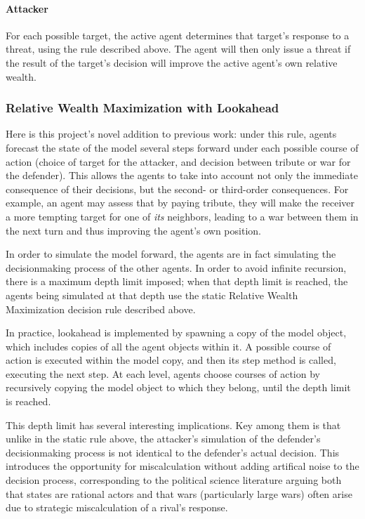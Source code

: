 \documentclass{article}
\begin{document}
\paragraph{Attacker}
For each possible target, the active agent determines that target's response to a threat, using the rule described above. The agent will then only issue a threat if the result of the target's decision will improve the active agent's own relative wealth.

\subsubsection{Relative Wealth Maximization with Lookahead}

Here is this project's novel addition to previous work: under this rule, agents forecast the state of the model several steps forward under each possible course of action (choice of target for the attacker, and decision between tribute or war for the defender). This allows the agents to take into account not only the immediate consequence of their decisions, but the second- or third-order consequences. For example, an agent may assess that by paying tribute, they will make the receiver a more tempting target for one of \emph{its} neighbors, leading to a war between them in the next turn and thus improving the agent's own position.

In order to simulate the model forward, the agents are in fact simulating the decisionmaking process of the other agents. In order to avoid infinite recursion, there is a maximum depth limit imposed; when that depth limit is reached, the agents being simulated at that depth use the static Relative Wealth Maximization decision rule described above.

In practice, lookahead is implemented by spawning a copy of the model object, which includes copies of all the agent objects within it. A possible course of action is executed within the model copy, and then its step method is called, executing the next step. At each level, agents choose courses of action by recursively copying the model object to which they belong, until the depth limit is reached. 

This depth limit has several interesting implications. Key among them is that unlike in the static rule above, the attacker's simulation of the defender's decisionmaking process is not identical to the defender's actual decision. This introduces the opportunity for miscalculation without adding artifical noise to the decision process, corresponding to the political science literature arguing both that states are rational actors and that wars (particularly large wars) often arise due to strategic miscalculation of a rival's response. 
\end{document}
